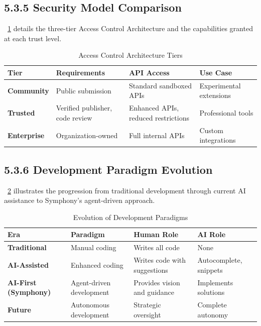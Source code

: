 \subsection*{5.3.5 Security Model Comparison}

~\ref{tab:security-tiers} details the three-tier Access Control Architecture and the capabilities granted at each trust level.

\begin{table}[H]
\caption{Access Control Architecture Tiers}
\label{tab:security-tiers}
\centering
\small
\begin{tabular}{@{}p{3cm}p{4cm}p{4cm}p{3cm}@{}}
\toprule
\textbf{Tier} & \textbf{Requirements} & \textbf{API Access} & \textbf{Use Case} \\
\midrule
\textbf{Community} & Public submission & Standard sandboxed APIs & Experimental extensions \\
\midrule
\textbf{Trusted} & Verified publisher, code review & Enhanced APIs, reduced restrictions & Professional tools \\
\midrule
\textbf{Enterprise} & Organization-owned & Full internal APIs & Custom integrations \\
\bottomrule
\end{tabular}
\end{table}

\subsection*{5.3.6 Development Paradigm Evolution}

~\ref{tab:paradigm-evolution} illustrates the progression from traditional development through current AI assistance to Symphony's agent-driven approach.

\begin{table}[H]
\caption{Evolution of Development Paradigms}
\label{tab:paradigm-evolution}
\centering
\small
\begin{tabular}{@{}p{3cm}p{4cm}p{4cm}p{3cm}@{}}
\toprule
\textbf{Era} & \textbf{Paradigm} & \textbf{Human Role} & \textbf{AI Role} \\
\midrule
\textbf{Traditional} & Manual coding & Writes all code & None \\
\midrule
\textbf{AI-Assisted} & Enhanced coding & Writes code with suggestions & Autocomplete, snippets \\
\midrule
\textbf{AI-First (Symphony)} & Agent-driven development & Provides vision and guidance & Implements solutions \\
\midrule
\textbf{Future} & Autonomous development & Strategic oversight & Complete autonomy \\
\bottomrule
\end{tabular}
\end{table}


